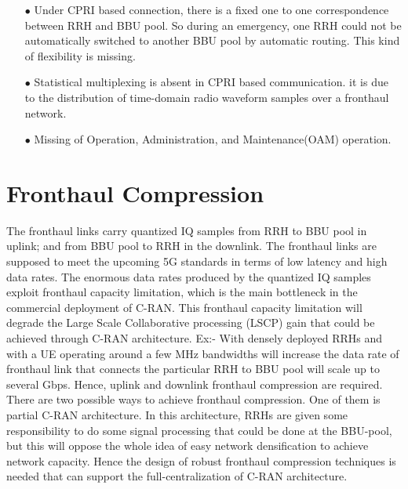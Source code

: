 \begin{multicols}{2}
\begin{itemize}
\begin{itemize}
\item[$\bullet$]  Under CPRI based connection, there is a fixed one to one correspondence between RRH and BBU pool. So during an emergency, one RRH could not be automatically switched to another BBU pool by automatic routing. This kind of flexibility is missing. 

\item[$\bullet$] Statistical multiplexing is absent in CPRI based communication. it is due to the distribution of time-domain radio waveform samples over a fronthaul network.

\item[$\bullet$] Missing of Operation, Administration, and Maintenance(OAM) operation.

\end{itemize}
\end{itemize}

\section{Fronthaul Compression}\label{sect06}

The fronthaul links carry quantized IQ samples from RRH to BBU pool in uplink; and from BBU pool to RRH in the downlink. The fronthaul links are supposed to meet the upcoming 5G standards in terms of low latency and high data rates. The enormous data rates produced by the quantized IQ samples exploit fronthaul capacity limitation, which is the main bottleneck in the commercial deployment of C-RAN. This fronthaul capacity limitation will degrade the Large Scale Collaborative processing (LSCP) gain that could be achieved through C-RAN architecture. Ex:- With densely deployed RRHs and with a UE operating around a few MHz bandwidths will increase the data rate of fronthaul link that connects the particular RRH to BBU pool will scale up to several Gbps. Hence, uplink and downlink fronthaul compression are required. There are two possible ways to achieve fronthaul compression. One of them is partial C-RAN architecture. In this architecture, RRHs are given some responsibility to do some signal processing that could be done at the BBU-pool, but this will oppose the whole idea of easy network densification to achieve network capacity. Hence the design of robust fronthaul compression techniques is needed that can support the full-centralization of C-RAN architecture.


\end{multicols}

